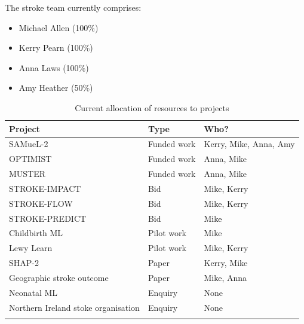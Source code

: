 The stroke team currently comprises:

\begin{itemize}
    \item Michael Allen (100\%)
    \item Kerry Pearn (100\%)
    \item Anna Laws (100\%)
    \item Amy Heather (50\%)
\end{itemize}

\begin{minipage}{\textwidth}
\begin{longtable}[]{@{}lll@{}}
\caption{Current allocation of resources to projects}\\
\toprule()
Project & Type & Who? \\
\midrule
SAMueL-2 & Funded work & Kerry, Mike, Anna, Amy \\
OPTIMIST & Funded work & Anna, Mike \\
MUSTER & Funded work & Anna, Mike \\
\midrule
STROKE-IMPACT & Bid & Mike, Kerry \\
STROKE-FLOW & Bid & Mike, Kerry \\
STROKE-PREDICT & Bid & Mike \\
\midrule
Childbirth ML & Pilot work & Mike \\
Lewy Learn & Pilot work & Mike, Kerry \\
\midrule
SHAP-2 & Paper & Kerry, Mike \\
Geographic stroke outcome & Paper & Mike, Anna \\
\midrule
Neonatal ML & Enquiry & None \\
Northern Ireland stoke organisation & Enquiry & None \\
\bottomrule()
\label{tab:resources}
\end{longtable}
\end{minipage}